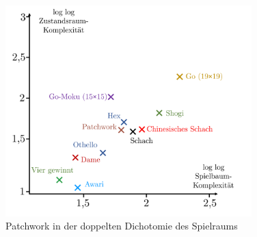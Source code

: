 \begin{figure}[!ht]
    \centering
    \includegraphics[width=0.85\textwidth]{res/pictures/game-complexity-coordinate-system.pdf}
    \caption{Patchwork in der doppelten Dichotomie des Spielraums}
    \label{fig:game-complexity-coordinate-system}
\end{figure}

\vfill
\vspace*{100cm}





